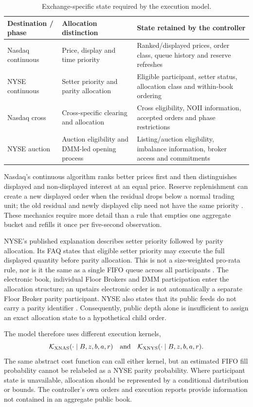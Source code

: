\documentclass[11pt]{article}
\numberwithin{equation}{section}
\theoremstyle{definition}
\theoremstyle{remark}
\theoremstyle{definition}
\newcommand{\K}{\mathcal K}
\begin{document}
\begin{table}[tb]
\centering\small
\caption{Exchange-specific state required by the execution model.}
\begin{tabularx}{\textwidth}{p{}YY}
\toprule Destination / phase & Allocation distinction & State retained by the controller \\\midrule
Nasdaq continuous & Price, display and time priority & Ranked/displayed prices, order class, queue history and reserve refreshes \\
NYSE continuous & Setter priority and parity allocation & Eligible participant, setter status, allocation class and within-book ordering \\
Nasdaq cross & Cross-specific clearing and allocation & Cross eligibility, NOII information, accepted orders and phase restrictions \\
NYSE auction & Auction eligibility and DMM-led opening process & Listing/auction eligibility, imbalance information, broker access and commitments \\
\bottomrule
\end{tabularx}
\end{table}

Nasdaq's continuous algorithm ranks better prices first and then distinguishes
displayed and non-displayed interest at an equal price. Reserve replenishment
can create a new displayed order when the residual drops below a normal trading
unit; the old residual and newly displayed clip need not have the same priority
\citep{nasdaqrules}. These mechanics require more detail than a rule that empties
one aggregate bucket and refills it once per five-second observation.

NYSE's published explanation describes setter priority followed by parity
allocation. Its FAQ states that eligible setter priority may execute the full
displayed quantity before parity allocation. This is not a size-weighted
pro-rata rule, nor is it the same as a single FIFO queue across all participants
\citep{nyseparity,nysefaq}. The electronic book, individual Floor Brokers and
DMM participation enter the allocation structure; an upstairs electronic order
is not automatically a separate Floor Broker parity participant. NYSE also
states that its public feeds do not carry a parity identifier \citep{nysefaq}.
Consequently, public depth alone is insufficient to assign an exact allocation
state to a hypothetical child order.

The model therefore uses different execution kernels,
\[
 \K_{\rm XNAS}(\cdot\mid B,z,b,a,r)
 \quad\hbox{and}\quad
 \K_{\rm XNYS}(\cdot\mid B,z,b,a,r).
\]
The same abstract cost function can call either kernel, but an estimated FIFO
fill probability cannot be relabeled as a NYSE parity probability. Where
participant state is unavailable, allocation should be represented by a
conditional distribution or bounds. The controller's own orders and execution
reports provide information not contained in an aggregate public book.
\end{document}
